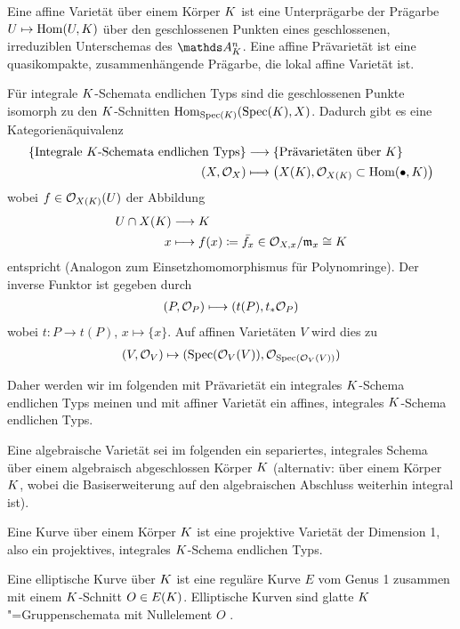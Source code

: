 \documentclass[german]{scrreprt}
\begin{document}
\begin{Definition}[Varietät]
  Eine affine Varietät über einem Körper $K$ ist eine Unterprägarbe der
  Prägarbe $U\mapsto \operatorname{Hom}(U,K)$ über den geschlossenen Punkten eines
  geschlossenen, irreduziblen Unterschemas des $\A_\K^n$.
  Eine affine Prävarietät ist eine quasikompakte, zusammenhängende
  Prägarbe, die lokal affine Varietät ist.

  Für integrale $K$-Schemata endlichen Typs sind die geschlossenen
  Punkte isomorph zu den $K$-Schnitten 
  $\operatorname{Hom}_{\operatorname{Spec}(K)}(\operatorname{Spec}(K),X)$.
  Dadurch gibt es eine Kategorienäquivalenz
  \begin{align*}
    \left\{\text{Integrale $K$-Schemata endlichen Typs}\right\}
    &\longrightarrow
      \left\{\text{Prävarietäten über $K$}\right\}\\
    (X,\mathcal{O}_X) 
    &\longmapsto
      \left( X(K), \mathcal{O}_{X(K)}\subset \operatorname{Hom}(\bullet, K) \right)
  \end{align*}
  wobei $f\in\mathcal{O}_{X(K)}(U)$ der Abbildung 
  \begin{align*}
    U\cap X(K) &\longrightarrow K\\
    x  &\longmapsto f(x)
         \coloneqq \bar{f_x}\in\mathcal{O}_{X,x}/\mathfrak{m}_x\cong K
  \end{align*}
  entspricht (Analogon zum Einsetzhomomorphismus für Polynomringe).
  Der inverse Funktor ist gegeben durch
  \begin{align*}
    (P,\mathcal{O}_P) \longmapsto (t(P), t_\ast\mathcal{O}_P) 
  \end{align*}
  wobei $t\colon P\to t(P)$, $x\mapsto \{x\}$. Auf affinen Varietäten
  $V$ wird dies zu
  \begin{gather*}
    (V, \mathcal{O}_V) \mapsto (\operatorname{Spec}(\mathcal{O}_V(V)), \mathcal{O}_{\operatorname{Spec}(\mathcal{O}_V(V))})
  \end{gather*}
  \cite[Theorem 3.37]{wedhorn}

  Daher werden wir im folgenden mit Prävarietät ein integrales
  $K$-Schema endlichen Typs meinen und mit affiner Varietät ein affines,
  integrales $K$-Schema endlichen Typs.

  Eine algebraische Varietät sei im folgenden ein separiertes, integrales
  Schema über einem algebraisch abgeschlossen Körper $K$
  (alternativ: über einem Körper $K$, wobei die Basiserweiterung auf
  den algebraischen Abschluss weiterhin integral ist).
\end{Definition}

\begin{Definition}
  Eine Kurve über einem Körper $K$ ist eine projektive Varietät der
  Dimension 1,
  also ein projektives, integrales $K$-Schema endlichen Typs.

  Eine elliptische Kurve über $K$ ist eine reguläre Kurve $E$ vom
  Genus 1 zusammen mit einem $K$-Schnitt $O\in E(K)$.
  Elliptische Kurven sind glatte \cite[Proposition III.3.1]{silverman}
  $K$"=Gruppenschemata mit Nullelement $O$
  \cite{silverman}.
\end{Definition}
\end{document}
